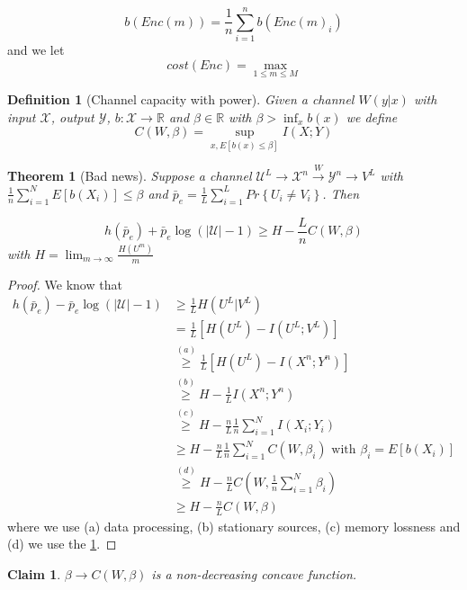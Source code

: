 \documentclass{article}
\newtheorem{theorem}{Theorem}[section]
\newtheorem{claim}{Claim}[section]
\newtheorem{definition}{Definition}[section]
\theoremstyle{definition} %
\renewcommand{\Pr}[1]{Pr\left\{#1\right\}}
\newcommand{\Ex}[1]{E\left[#1\right]}
\def\U{\mathcal{U}}
\def\X{\mathcal{X}}
\def\Y{\mathcal{Y}}
\def\R{\mathbb{R}}
\begin{document}
\[
  b(Enc(m)) = \frac 1 n \sum_{i=1}^n b(Enc(m)_i)
\]
and we let
\[
  cost(Enc) = \max_{1\leq m \leq M}
\]

\begin{definition}[Channel capacity with power]
Given a channel $W(y|x)$ with input $\X$, output $\Y$, $b:\X\to \R$ and $\beta \in \R$ with $\beta > \inf_x b(x)$ we define
\[
  C(W, \beta) = \sup_{x, \Ex{b(x) \leq \beta}} I(X;Y)
\]
\end{definition}

\begin{theorem}[Bad news]
  Suppose a channel $\U^L \to \X^n \xrightarrow{W} \Y^n \to V^L$ with $\frac 1 n \sum_{i=1}^N \Ex{b(X_i)} \leq \beta$ and $\bar p_e = \frac 1 L \sum_{i=1}^L \Pr{U_i \not= V_i}$. Then

  \[
    h(\bar p_e) + \bar p_e \log(|\U| - 1) \geq H - \frac L n C(W, \beta)
  \]
  with $H=\lim_{m \to\infty} \frac {H(U^m)} m$
\end{theorem}

\begin{proof}
  We know that
  \begin{align*}
    h(\bar p_e) - \bar p_e \log(|\U| - 1) &\geq \frac 1 L H(U^L| V^L)\\
    &=\frac 1 L [H(U^L) - I(U^L;V^L)]\\
    &\overset{(a)}\geq \frac 1 L [H(U^L) - I(X^n;Y^n)]\\
    &\overset{(b)}\geq H - \frac 1 L I(X^n;Y^n) \\
    &\overset{(c)}\geq H - \frac n L \frac 1 n \sum_{i=1}^N I(X_i;Y_i) \\
    &\geq H -  \frac n L \frac 1 n \sum_{i=1}^N C(W, \beta_i)\text{ with } \beta_i = \Ex{b(X_i)} \\
    &\overset{(d)}\geq H - \frac n L C\left(W, \frac 1 n \sum_{i=1}^N \beta_i\right) \\
    &\geq H - \frac n L C(W, \beta)
  \end{align*}
  where we use (a) data processing, (b) stationary sources, (c) memory lossness and (d) we use the \cref{claim:concavity_inf}.
\end{proof}

\begin{claim}
  \label{claim:concavity_inf}
  $\beta \to C(W, \beta)$ is a non-decreasing concave function.
\end{claim}
\end{document}
